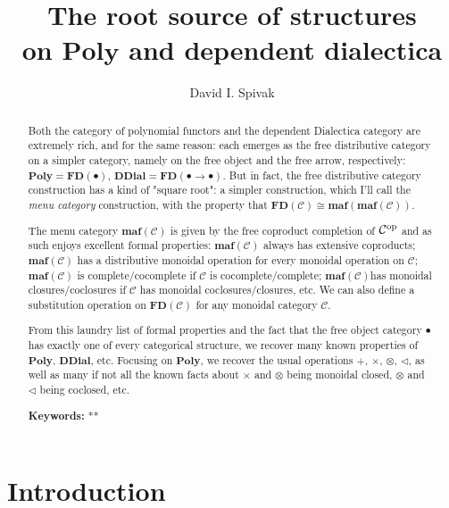 \documentclass[11pt, one side, article]{memoir}
\theoremstyle{definition}
\theoremstyle{plain}
\newcommand{\cat}[1]{\mathcal{#1}}%
\newcommand{\Cat}[1]{\mathbf{#1}}%
\newcommand{\op}{^\tn{op}}
\newcommand{\tn}[1]{\textnormal{#1}}
\newcommand{\poly}{\Cat{Poly}}
\newcommand{\0}{\Cat{0}}
\newcommand{\1}{\Cat{1}}
\newcommand{\tri}{\mathbin{\triangleleft}}
\newcommand{\fd}{\Cat{FD}}
\newcommand{\opfam}{\Cat{maf}}
\newcommand{\ddial}{\Cat{DDial}}
\begin{document}
\title{The root source of structures\\on $\poly$ and dependent dialectica
}

\author{David I. Spivak}

\date{\vspace{-.2in}}

\maketitle

\begin{abstract}
Both the category of polynomial functors and the dependent Dialectica category are extremely rich, and for the same reason: each emerges as the free distributive category on a simpler category, namely on the free object and the free arrow, respectively: $\poly=\fd(\bullet)$, $\ddial=\fd(\bullet\to\bullet)$. But in fact, the free distributive category construction has a kind of "square root": a simpler construction, which I'll call the \emph{menu category} construction, with the property that $\fd(\cat{C})\cong\opfam(\opfam(\cat{C}))$.

The menu category $\opfam(\cat{C})$ is given by the free coproduct completion of $\cat{C}\op$ and as such enjoys excellent formal properties: $\opfam(\cat{C})$ always has extensive coproducts; $\opfam(\cat{C})$ has a distributive monoidal operation for every monoidal operation on $\cat{C}$; $\opfam(\cat{C})$ is complete/cocomplete if $\cat{C}$ is cocomplete/complete; $\opfam(\cat{C})$has monoidal closures/coclosures if $\cat{C}$ has monoidal coclosures/closures, etc. We can also define a substitution operation on $\fd(\cat{C})$ for any monoidal category $\cat{C}$. 

From this laundry list of formal properties and the fact that the free object category $\bullet$ has exactly one of every categorical structure, we recover many known properties of $\poly$, $\Cat{DDial}$, etc. Focusing on $\poly$, we recover the usual operations $+$, $\times$, $\otimes$, $\tri$, as well as many if not all the known facts about $\times$ and $\otimes$ being monoidal closed, $\otimes$ and $\tri$ being coclosed, etc.  \\

\smallskip

\noindent
\textbf{Keywords:} **
\end{abstract}

\chapter{Introduction}
\end{document}
